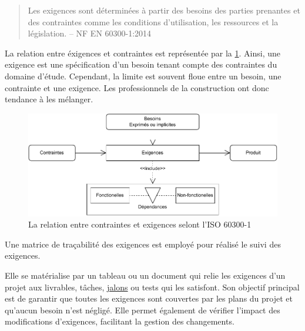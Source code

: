 \documentclass[a4paper,12pt]{article}
\begin{document}
\begin{quote}
Les exigences sont déterminées à partir des besoins des parties prenantes et des contraintes comme les conditions d’utilisation, les ressources et la législation. -- NF EN 60300-1:2014\autocite{GestionSureteFonctionnement2014}
\end{quote}

La relation entre éxigences et contraintes est représentée par la \ref{fig:org3a43453}. Ainsi, une exigence est une spécification d'un besoin tenant compte des contraintes du domaine d'étude. Cependant, la limite est souvent floue entre un besoin, une contrainte et une exigence. Les professionnels de la construction ont donc tendance à les mélanger.

\begin{figure}[htbp]
\centering
\includegraphics[width=.9\linewidth]{./svg/relation-contraintes-exigences.pdf}
\caption{\label{fig:org3a43453}La relation entre contraintes et exigences selont l'ISO 60300-1\autocite{GestionSureteFonctionnement2014}}
\end{figure}

Une matrice de traçabilité des exigences est employé pour réalisé le suivi des exigences.

Elle se matérialise par un tableau ou un document qui relie les exigences d'un projet aux livrables, tâches, \protect\hyperlink{gls-1}{\label{gls-1-use-1}jalons} ou tests qui les satisfont. Son objectif principal est de garantir que toutes les exigences sont couvertes par les plans du projet et qu'aucun besoin n'est négligé. Elle permet également de vérifier l'impact des modifications d'exigences, facilitant la gestion des changements.
\end{document}
